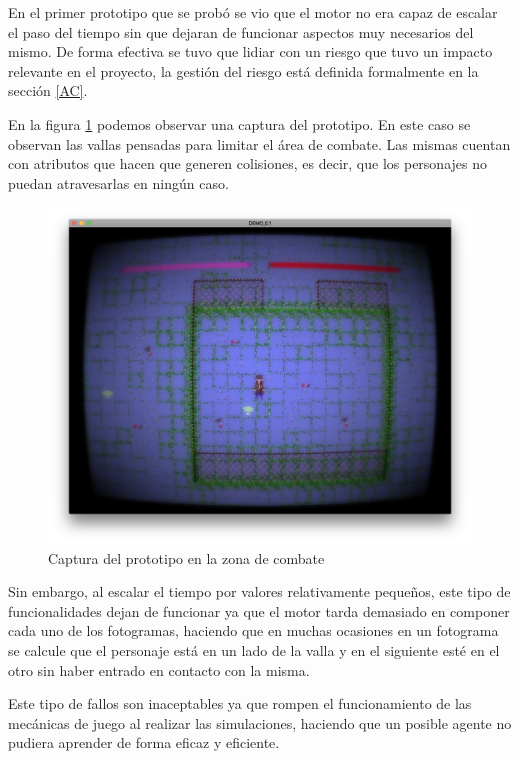 \bigskip

En el primer prototipo que se probó se vio que el motor no era capaz de escalar el paso del tiempo sin que dejaran de funcionar aspectos muy necesarios del mismo. De forma efectiva se tuvo que lidiar con un riesgo que tuvo un impacto relevante en el proyecto, la gestión del riesgo está definida formalmente en la sección \ref{AC}.

\bigskip

En la figura \ref{unity:combate} podemos observar una captura del prototipo. En este caso se observan las vallas pensadas para limitar el área de combate. Las mismas cuentan con atributos que hacen que generen colisiones, es decir, que los personajes no puedan atravesarlas en ningún caso.

\bigskip

\begin{figure}
	\centerline{\includegraphics[width=12cm]{otros/otrasCapturas/valla1.png}}
	\caption{Captura del prototipo en la zona de combate}
	\label{unity:combate}
\end{figure}

Sin embargo, al escalar el tiempo por valores relativamente pequeños, este tipo de funcionalidades dejan de funcionar ya que el motor tarda demasiado en componer cada uno de los fotogramas, haciendo que en muchas ocasiones en un fotograma se calcule que el personaje está en un lado de la valla y en el siguiente esté en el otro sin haber entrado en contacto con la misma.

\bigskip

Este tipo de fallos son inaceptables ya que rompen el funcionamiento de las mecánicas de juego al realizar las simulaciones, haciendo que un posible agente no pudiera aprender de forma eficaz y eficiente.

